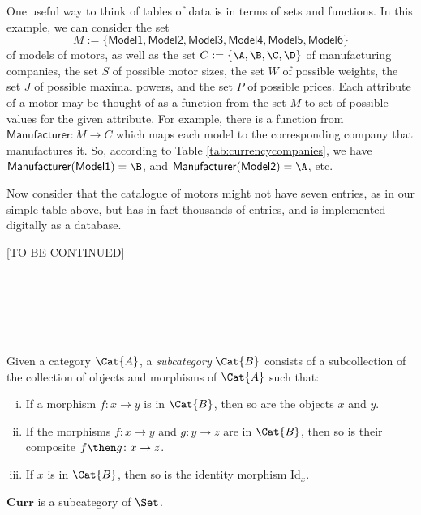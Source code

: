 One useful way to think of tables of data is in terms of sets and functions. In this example, we can consider the set
$$
M := \{ \mathsf{Model1}, \mathsf{Model2}, \mathsf{Model3}, \mathsf{Model4}, \mathsf{Model5}, \mathsf{Model6} \}
$$ 
of models of motors, as well as the set $C := \{ \A, \B, \C, \D \}$ of manufacturing companies, the set $S$ of possible motor sizes, the set $W$ of possible weights, the set $J$ of possible maximal powers, and the set $P$ of possible prices. Each attribute of a motor may be thought of as a function from the set $M$ to set of possible values for the given attribute. For example, there is a function from $\mathsf{Manufacturer}: M \longrightarrow C$ which maps each model to the corresponding company that manufactures it. So, according to Table \ref{tab:currencycompanies}, we have  $\mathsf{Manufacturer}(\mathsf{Model1}) = \B$, and $\mathsf{Manufacturer}(\mathsf{Model2}) = \A$, etc.

Now consider that the catalogue of motors might not have seven entries, as in our simple table above, but has in fact thousands of entries, and is implemented digitally as a database. 

[TO BE CONTINUED]

\

\

\
\begin{shaded}
\begin{definition}[Subcategory]
\label{def:subcategory}
	Given a category $\Cat{A}$, a \emph{subcategory} $\Cat{B}$ consists of a subcollection of the collection of objects and morphisms of $\Cat{A}$ such that:
	\begin{enumerate}[(i)]
	\item If a morphism $f \colon x\to y$ is in $\Cat{B}$, then so are the objects $x$ and $y$.
	\item If the morphisms $f\colon x\to y$ and $g\colon y\to z$ are in $\Cat{B}$, then so is their composite $f\then g\colon x\to z$.
	\item If $x$ is in $\Cat{B}$, then so is the identity morphism $\text{Id}_x$.
	\end{enumerate}
\end{definition}
\end{shaded}

\begin{lemma}
    $\mathbf{Curr}$ is a subcategory of $\Set$.
\end{lemma}

